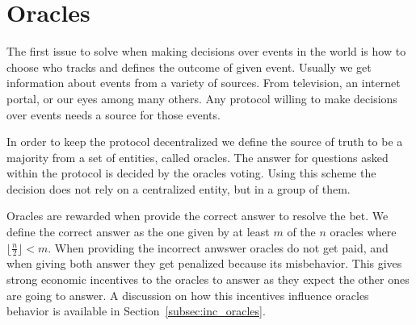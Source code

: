 \section{Oracles}

The first issue to solve when making decisions over events in the world is how
  to choose who tracks and defines the outcome of given event.
Usually we get information about events from a variety of sources.
From television, an internet portal, or our eyes among many others. Any protocol
  willing to make decisions over events needs a source for those events.

In order to keep the protocol decentralized we define the source of truth to be
  a majority from a set of entities, called oracles.
The answer for questions asked within the protocol is decided by the oracles
  voting.
Using this scheme the decision does not rely on a centralized entity, but in a
  group of them.

Oracles are rewarded when provide the correct answer to resolve the bet.
We define the correct answer as the one given by at least $m$ of the $n$ oracles
  where $\lfloor \frac{n}{2} \rfloor < m$.
When providing the incorrect anwswer oracles do not get paid, and when giving
  both answer they get penalized because its misbehavior. This gives strong
  economic incentives to the oracles to answer as they expect the other ones
  are going to answer.
A discussion on how this incentives influence oracles behavior is available
  in Section~\ref{subsec:inc_oracles}.
